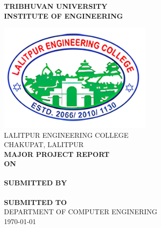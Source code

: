 \begin{center}

    \thispagestyle{empty}
    {\fontsize{16 pt}{12} \selectfont\textbf{TRIBHUVAN UNIVERSITY} \\
        \textbf{INSTITUTE OF ENGINEERING}} \\
    \vspace{0.3 in}

    \includegraphics[width= 3in ]{img/leclogo21.png} \\
    \vspace{0.05 in}
    LALITPUR ENGINEERING COLLEGE \\
    CHAKUPAT, LALITPUR \\

    \vspace{0.5 in}
    \textbf{MAJOR PROJECT REPORT}\\
    \textbf{ON}\\
    {\fontsize{16 pt}{12} \selectfont \textbf{\thetitle}}\\
    \vspace{1.1 in}
    \textbf{ SUBMITTED BY}  \\
    {\theauthor} \\
    \vspace{1 in}
    \textbf{ SUBMITTED TO}  \\
    DEPARTMENT OF COMPUTER ENGINERING \\
    \vspace{0.7 in}
    \today \\
\end{center}
